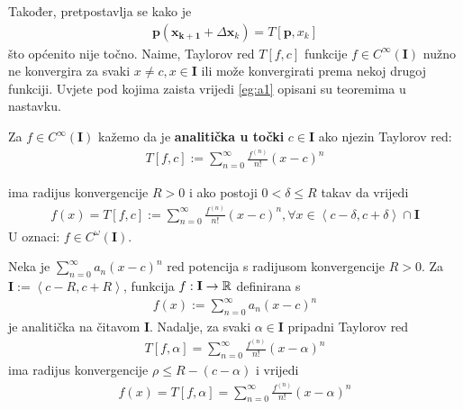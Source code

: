 \documentclass[a4paper,twoside,12pt]{memoir} %
\begin{document}
Također,
pretpostavlja se kako je 
\begin{align}\label{eg:a1}
	\mathbf{p}(\mathbf{x_{k+1}}+\Delta \mathbf{x}_k) = T \left[\mathbf{p},x_k \right]
\end{align}
što općenito nije točno.
Naime, Taylorov red $T \left[f,c\right] $ funkcije 
$f \in C^\infty(\mathbf{I})$ nužno ne konvergira za svaki $x \not = c, x \in \mathbf{I}$
ili može konvergirati prema nekoj drugoj funkciji.
Uvjete pod kojima zaista vrijedi \ref{eg:a1} opisani su teoremima u nastavku.

\begin{defn}
	Za $f \in C^\infty(\mathbf{I})$ kažemo da je \textbf{analitička u točki} $c \in \mathbf{I}$ ako njezin Taylorov red:
	\begin{align*}
		T \left[f,c\right] := \sum_{n=0}^{\infty} \frac{f^{(n)}}{n!} \left(x - c\right)^n
	\end{align*}
	
	ima radijus konvergencije $R > 0$ i ako postoji $0 < \delta \leq R$ takav da vrijedi 
	\begin{align*}
	f(x) = T \left[f,c\right] := \sum_{n=0}^{\infty} \frac{f^{(n)}}{n!} \left(x - c\right)^n,
	\forall x \in \left < c-\delta, c+\delta \right > \cap \mathbf{I}
	\end{align*}
	U oznaci: $f \in C^\omega(\mathbf{I})$.
\end{defn}
\begin{thm}\label{thm:konv1}
	Neka je $\sum_{n=0}^{\infty} a_n \left(x - c\right)^n$ red potencija s radijusom konvergencije $R > 0$. Za $\mathbf{I} := \left < c-R, c+R\right >$,
	funkcija $f: \mathbf{I} \to \mathbb{R}$ definirana s 
	\begin{align}
		f(x) := \sum_{n=0}^{\infty} a_n \left(x - c\right)^n
	\end{align}
	je analitička na čitavom $\mathbf{I}$. Nadalje, za svaki $\alpha \in \mathbf{I}$ 
	pripadni Taylorov red
	\begin{align}
		T \left[f,\alpha \right] = \sum_{n=0}^{\infty} \frac{f^{(n)}}{n!} \left(x - \alpha \right)^n
	\end{align}
	ima radijus konvergencije $\rho \leq R - (c - \alpha)$ i vrijedi 
	\begin{align}
	f(x) = T \left[f,\alpha \right] = \sum_{n=0}^{\infty} \frac{f^{(n)}}{n!} \left(x - \alpha \right)^n
	\end{align}
\end{thm}
\end{document}
